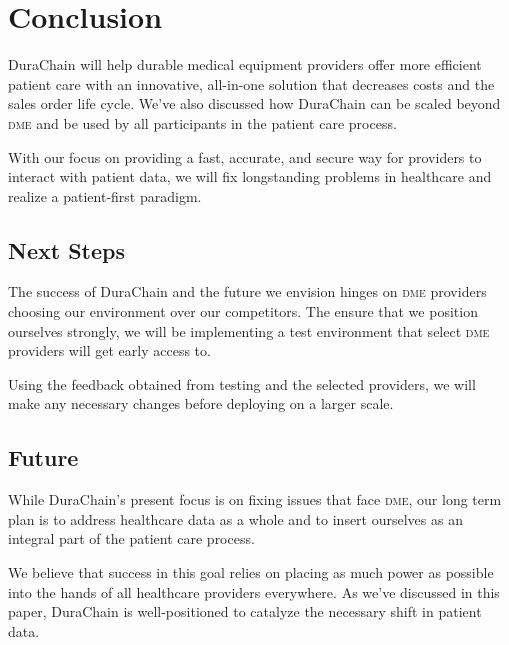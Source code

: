 \section{Conclusion}
DuraChain will help durable medical equipment providers offer more efficient patient care with an innovative, all-in-one solution that decreases costs and the sales order life cycle.  We've also discussed how DuraChain can be scaled beyond \textsc{dme} and be used by all participants in the patient care process.%

With our focus on providing a fast, accurate, and secure way for providers to interact with patient data, we will fix longstanding problems in healthcare and realize a patient-first paradigm.%

\subsection{Next Steps}
The success of DuraChain and the future we envision hinges on \textsc{dme} providers choosing our environment over our competitors. The ensure that we position ourselves strongly, we will be implementing a test environment that select \textsc{dme} providers will get early access to.%

Using the feedback obtained from testing and the selected providers, we will make any necessary changes before deploying on a larger scale.%

\subsection{Future}
While DuraChain's present focus is on fixing issues that face \textsc{dme}, our long term plan is to address healthcare data as a whole and to insert ourselves as an integral part of the patient care process.%

We believe that success in this goal relies on placing as much power as possible into the hands of all healthcare providers everywhere. As we've discussed in this paper, DuraChain is well-positioned to catalyze the necessary shift in patient data.%
